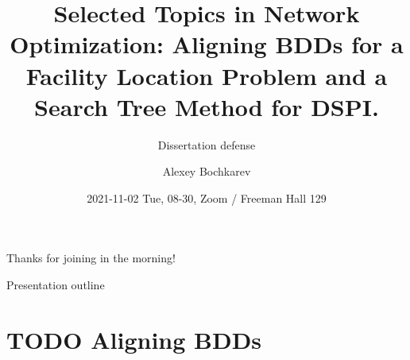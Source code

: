 \documentclass[10pt, xcolor=svgnames]{beamer}
\author{Alexey Bochkarev}
\date{2021-11-02 Tue, 08-30, Zoom / Freeman Hall 129}
\title{Selected Topics in Network Optimization: Aligning BDDs for a Facility Location Problem and a Search Tree Method for DSPI.}
\subtitle{Dissertation defense}
\begin{document}
\maketitle
{%
\begin{frame}[plain,b]
\centering
\LARGE Thanks for joining in the morning!\vspace{4ex}
\end{frame}
}%

\begin{frame}[label={sec:orgb62bcd2}]{Presentation outline}
\tableofcontents
\end{frame}

\section{{\bfseries\sffamily TODO} Aligning BDDs}
\label{sec:orgb902488}
\end{document}
